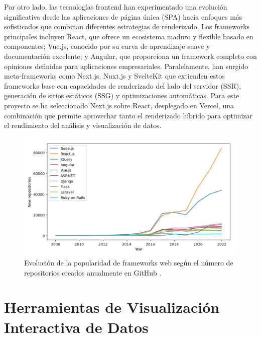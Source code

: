 Por otro lado, las tecnologías frontend han experimentado una evolución significativa desde las aplicaciones de página única (SPA) hacia enfoques más sofisticados que combinan diferentes estrategias de renderizado. Los frameworks principales \cite{Swacha2023_WebFrameworks} incluyen React, que ofrece un ecosistema maduro y flexible basado en componentes; Vue.js, conocido por su curva de aprendizaje suave y documentación excelente; y Angular, que proporciona un framework completo con opiniones definidas para aplicaciones empresariales. Paralelamente, han surgido meta-frameworks como Next.js, Nuxt.js y SvelteKit que extienden estos frameworks base con capacidades de renderizado del lado del servidor (SSR), generación de sitios estáticos (SSG) y optimizaciones automáticas. Para este proyecto se ha seleccionado Next.js sobre React, desplegado en Vercel, una combinación que permite aprovechar tanto el renderizado híbrido para optimizar el rendimiento del análisis y visualización de datos.

\begin{figure}[htbp]
\centering
\includegraphics[width=\textwidth]{imagenes/grafica_frameworks.png}
\caption{Evolución de la popularidad de frameworks web según el número de repositorios creados anualmente en GitHub \cite{Swacha2023_WebFrameworks}.}
\label{fig:frameworks_github}
\end{figure}



\section{Herramientas de Visualización Interactiva de Datos}

